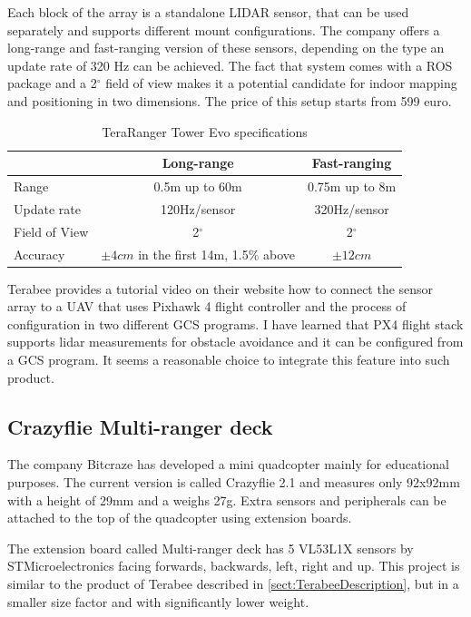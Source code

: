 Each block of the array is a standalone LIDAR sensor, that can be used separately and supports different
mount configurations. The company offers a long-range and fast-ranging version of these sensors, depending 
on the type an update rate of 320 Hz can be achieved. The fact that system comes with a ROS package and a 
2$^{\circ}$ field of view makes it a potential candidate for indoor mapping and positioning in two dimensions. 
The price of this setup starts from 599 euro\cite{TerabeeTeraRanger}.

\begin{table}[ht]
	\footnotesize
	\centering
	\begin{tabular}{ l c c }
		\toprule
		                & Long-range                                & Fast-ranging \\
		\midrule
		Range           & 0.5m up to 60m                            & 0.75m up to 8m \\
		Update rate     & 120Hz/sensor                              & 320Hz/sensor\\
		Field of View   & 2$^{\circ}$                               & 2$^{\circ}$\\
		Accuracy        & $\pm 4cm$ in the first 14m, 1.5\% above   & $\pm 12cm$\\
		\bottomrule
	\end{tabular}
	\caption{TeraRanger Tower Evo specifications}
	\label{tab:tera_ranger_features}
\end{table}

Terabee provides a tutorial video on their website\cite{TerabeeTeraRanger} how to connect the 
sensor array to a UAV that uses Pixhawk 4 flight controller and the process of configuration 
in two different GCS programs. I have learned that PX4 flight stack supports lidar measurements
for obstacle avoidance and it can be configured from a GCS program. It seems a reasonable choice 
to integrate this feature into such product.

\subsection{Crazyflie Multi-ranger deck}
The company Bitcraze has developed a mini quadcopter mainly for educational purposes. The current version is
called Crazyflie 2.1 and measures only 92x92mm with a height of 29mm and a weighs 27g.
Extra sensors and peripherals can be attached to the top of the quadcopter using extension boards.

The extension board called Multi-ranger deck has 5 VL53L1X sensors by STMicroelectronics facing forwards, 
backwards, left, right and up. This project is similar to the product of Terabee described in \ref{sect:TerabeeDescription}, 
but in a smaller size factor and with significantly lower weight.

